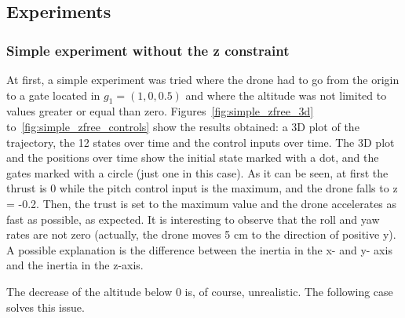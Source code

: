 \documentclass[letterpaper, 10 pt, conference]{ieeeconf}  %
\begin{document}
\subsection{Experiments}

\subsubsection{Simple experiment without the z constraint}
At first, a simple experiment was tried where the drone had to go from the origin to a gate located in $g_1=(1, 0, 0.5)$ and where the altitude was not limited to values greater or equal than zero. Figures~\ref{fig:simple_zfree_3d} to~\ref{fig:simple_zfree_controls} show the results obtained: a 3D plot of the trajectory, the 12 states over time and the control inputs over time. The 3D plot and the positions over time show the initial state marked with a dot, and the gates marked with a circle (just one in this case). As it can be seen, at first the thrust is 0 while the pitch control input is the maximum, and the drone falls to z = -0.2. Then, the trust is set to the maximum value and the drone accelerates as fast as possible, as expected. It is interesting to observe that the roll and yaw rates are not zero (actually, the drone moves 5 cm to the direction of positive y). A possible explanation is the difference between the inertia in the x- and y- axis and the inertia in the z-axis.

The decrease of the altitude below 0 is, of course, unrealistic. The following case solves this issue.
\end{document}
